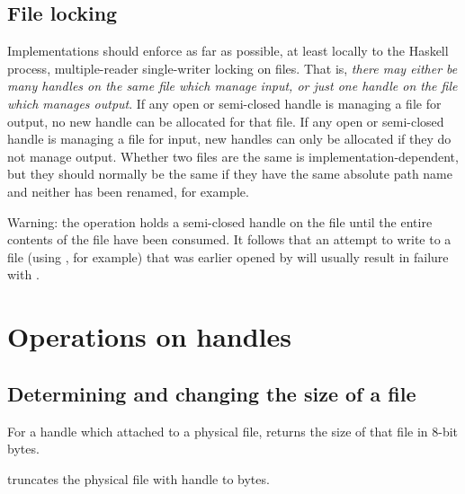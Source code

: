 \subsection{File locking}
Implementations should enforce as far as possible, at least locally to
 the Haskell process, multiple-reader single-writer locking on files. That
  is, \emph{there may either be many handles on the same file which manage}
 \emph{input, or just one handle on the file which manages output}. If any open
 or semi-closed handle is managing a file for output, no new handle can be
 allocated for that file. If any open or semi-closed handle is managing
 a file for input, new handles can only be allocated if they do not manage
 output. Whether two files are the same is implementation-dependent, but
 they should normally be the same if they have the same absolute path name
 and neither has been renamed, for example.\par
Warning: the  operation holds a semi-closed handle on the file
 until the entire contents of the file have been consumed. It follows that
 an attempt to write to a file (using , for example) that was
 earlier opened by  will usually result in failure
 with .\par
\section{Operations on handles}
\subsection{Determining and changing the size of a file}
\begin{haddockdesc}
\item[\begin{tabular}{@{}l}
hFileSize :: Handle -> IO Integer
\end{tabular}]
{\haddockbegindoc
For a handle  which attached to a physical file,
   returns the size of that file in 8-bit bytes.\par}
\end{haddockdesc}
\begin{haddockdesc}
\item[\begin{tabular}{@{}l}
hSetFileSize :: Handle -> Integer -> IO ()
\end{tabular}]
{\haddockbegindoc
{}   truncates the physical file with handle  to  bytes.\par}
\end{haddockdesc}
